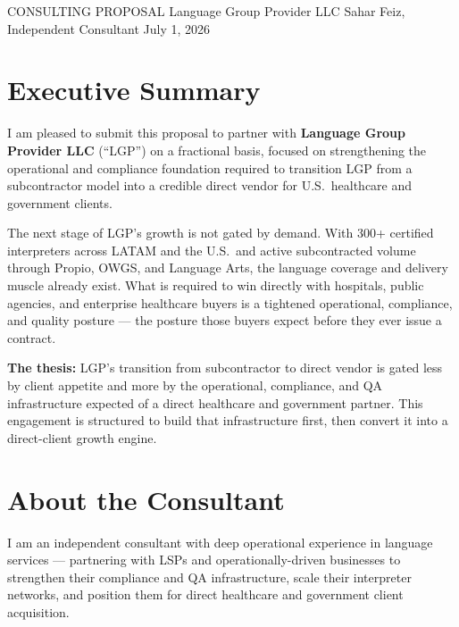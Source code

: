 \documentclass{proposal}
\begin{document}
\proposaltitle
  {CONSULTING PROPOSAL}
  {Language Group Provider LLC}
  {Sahar Feiz, Independent Consultant}
  {July 1, 2026}

\section{Executive Summary}

I am pleased to submit this proposal to partner with \textbf{Language Group
Provider LLC} (``LGP'') on a fractional basis, focused on strengthening the
operational and compliance foundation required to transition LGP from a
subcontractor model into a credible direct vendor for U.S.\ healthcare and
government clients.

The next stage of LGP's growth is not gated by demand. With 300+ certified
interpreters across LATAM and the U.S.\ and active subcontracted volume
through Propio, OWGS, and Language Arts, the language coverage and delivery
muscle already exist. What is required to win directly with hospitals, public
agencies, and enterprise healthcare buyers is a tightened operational,
compliance, and quality posture --- the posture those buyers expect before
they ever issue a contract.

\begin{clausebox}
\sffamily\small
\textbf{The thesis:} LGP's transition from subcontractor to direct vendor is
gated less by client appetite and more by the operational, compliance, and
QA infrastructure expected of a direct healthcare and government partner.
This engagement is structured to build that infrastructure first, then
convert it into a direct-client growth engine.
\end{clausebox}

\section{About the Consultant}

I am an independent consultant with deep operational experience in language
services --- partnering with LSPs and operationally-driven businesses to
strengthen their compliance and QA infrastructure, scale their interpreter
networks, and position them for direct healthcare and government client
acquisition.
\end{document}
